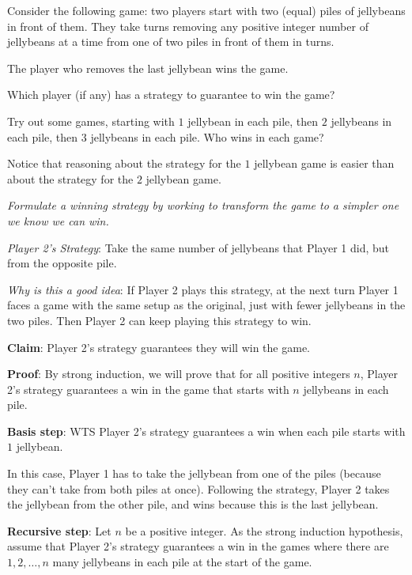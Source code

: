 
Consider the following game: two players start with 
two (equal) piles of jellybeans in front of them.
They take turns removing any positive integer number
of jellybeans at a time from one of two piles in 
front of them in turns.

The player who removes the last jellybean wins the game.

Which player (if any) has a strategy to guarantee
to win the game?


Try out some games, starting with $1$ jellybean in each pile,
then $2$ jellybeans in each pile, then $3$ jellybeans in each pile.
Who wins in each game?

\vspace{200pt}


Notice that reasoning about the strategy for the $1$ jellybean 
game is easier than about the strategy for the $2$ jellybean game.

{\it Formulate a winning strategy by working to 
transform the game to a simpler one we know we can win.}

\newpage

{\it Player 2's Strategy}: Take the same number of jellybeans that Player 1 did, 
but from the opposite pile. 


{\it Why is this a good idea}: If Player 2 plays this strategy, at the next turn
Player 1 faces a game with the same setup as the original, just with fewer
jellybeans in the two piles. Then Player 2 can keep playing this strategy to win.

{\bf Claim}: Player 2's strategy guarantees they will win the game.

{\bf Proof}: By strong induction, we will prove that for all positive 
integers $n$, Player 2's strategy guarantees a win in the game that starts with 
$n$ jellybeans in each pile.

{\bf Basis step}: WTS Player 2's strategy guarantees a win 
when each pile starts with $1$ jellybean.

In this case, Player 1 has to take the jellybean from one of the piles
(because they can't take from both piles at once).
Following the strategy, Player 2 takes the jellybean from the 
other pile, and wins because this is the last jellybean.

{\bf Recursive step}: Let $n$ be a positive integer. 
As the strong induction hypothesis, assume that
Player 2's strategy guarantees a win in the games 
where there are $1, 2, \ldots, n$ many jellybeans in each 
pile at the start of the game.

